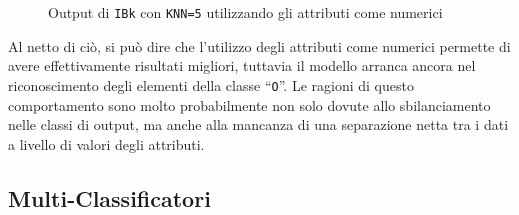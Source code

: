 \begin{figure}[H]
  \centering
  \caption{Output di \texttt{IBk} con \texttt{KNN=5} utilizzando gli attributi come numerici}%
  \label{fig:ibk:5-num}
\end{figure}

Al netto di ciò, si può dire che l'utilizzo degli attributi come numerici permette di avere effettivamente risultati migliori,
tuttavia il modello arranca ancora nel riconoscimento degli elementi della classe ``\texttt{O}''.
Le ragioni di questo comportamento sono molto probabilmente non solo dovute allo sbilanciamento nelle classi di output,
ma anche alla mancanza di una separazione netta tra i dati a livello di valori degli attributi.




\subsection{Multi-Classificatori}

